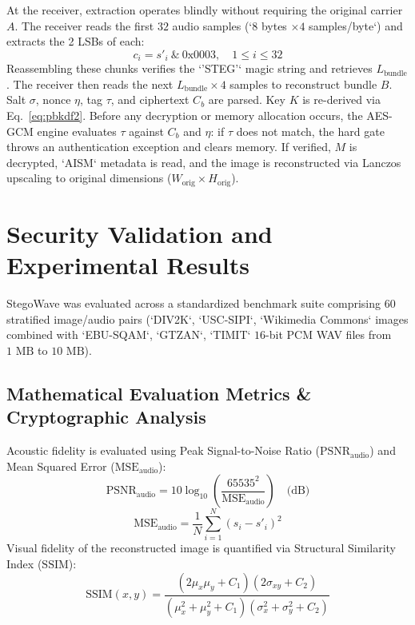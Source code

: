 \documentclass[10pt,conference]{IEEEtran}
\begin{document}
At the receiver, extraction operates blindly without requiring the original carrier $A$. The receiver reads the first $32$ audio samples (`8 bytes $\times 4$ samples/byte`) and extracts the 2 LSBs of each:
\begin{equation}
c_i = s'_i \ \& \ \text{0x0003}, \quad 1 \le i \le 32
\label{eq:extraction}
\end{equation}
Reassembling these chunks verifies the `'STEG'` magic string and retrieves $L_{\text{bundle}}$. The receiver then reads the next $L_{\text{bundle}} \times 4$ samples to reconstruct bundle $B$. Salt $\sigma$, nonce $\eta$, tag $\tau$, and ciphertext $C_b$ are parsed. Key $K$ is re-derived via Eq.~\ref{eq:pbkdf2}. Before any decryption or memory allocation occurs, the AES-GCM engine evaluates $\tau$ against $C_b$ and $\eta$: if $\tau$ does not match, the hard gate throws an authentication exception and clears memory. If verified, $M$ is decrypted, `AISM` metadata is read, and the image is reconstructed via Lanczos upscaling to original dimensions ($W_{\text{orig}} \times H_{\text{orig}}$).

\section{Security Validation and Experimental Results}
StegoWave was evaluated across a standardized benchmark suite comprising 60 stratified image/audio pairs (`DIV2K`, `USC-SIPI`, `Wikimedia Commons` images combined with `EBU-SQAM`, `GTZAN`, `TIMIT` $16$-bit PCM WAV files from $1\text{ MB}$ to $10\text{ MB}$).

\subsection{Mathematical Evaluation Metrics & Cryptographic Analysis}
Acoustic fidelity is evaluated using Peak Signal-to-Noise Ratio ($\text{PSNR}_{\text{audio}}$) and Mean Squared Error ($\text{MSE}_{\text{audio}}$):
\begin{equation}
\text{PSNR}_{\text{audio}} = 10 \log_{10} \left( \frac{65535^2}{\text{MSE}_{\text{audio}}} \right) \quad \text{(dB)}
\label{eq:psnr_audio}
\end{equation}
\begin{equation}
\text{MSE}_{\text{audio}} = \frac{1}{N} \sum_{i=1}^{N} (s_i - s'_i)^2
\label{eq:mse_audio}
\end{equation}
Visual fidelity of the reconstructed image is quantified via Structural Similarity Index ($\text{SSIM}$):
\begin{equation}
\text{SSIM}(x,y) = \frac{(2\mu_x\mu_y + C_1)(2\sigma_{xy} + C_2)}{(\mu_x^2 + \mu_y^2 + C_1)(\sigma_x^2 + \sigma_y^2 + C_2)}
\label{eq:ssim}
\end{equation}
\end{document}
